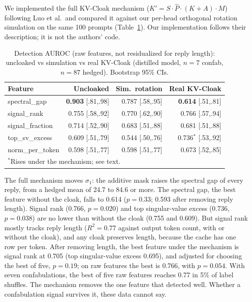 We implemented the full KV-Cloak mechanism
($K' = S \cdot \hat{P} \cdot (K + A) \cdot M$) following
Luo et al.\ and compared it against our per-head orthogonal rotation
simulation on the same 100 prompts (Table~\ref{tab:real_vs_sim}). Our
implementation follows their description; it is not the authors' code.

\begin{table}[h]
\centering
\caption{Detection AUROC (raw features, not residualized for reply
length): uncloaked vs simulation vs real KV-Cloak (distilled model, $n=7$
confab, $n=87$ hedged). Bootstrap 95\% CIs.}
\label{tab:real_vs_sim}
\begin{tabular}{lrrr}
\toprule
Feature & Uncloaked & Sim.\ rotation & Real KV-Cloak \\
\midrule
spectral\_gap & \textbf{0.903} [.81,.98] & 0.787 [.58,.95] & \textbf{0.614} [.51,.81] \\
signal\_rank & 0.755 [.58,.92] & 0.770 [.62,.90] & 0.766 [.57,.94] \\
signal\_fraction & 0.714 [.52,.90] & 0.683 [.51,.88] & 0.681 [.51,.88] \\
top\_sv\_excess & 0.609 [.51,.79] & 0.544 [.50,.76] & 0.736$^*$ [.53,.92] \\
norm\_per\_token & 0.598 [.51,.77] & 0.598 [.51,.77] & 0.673 [.52,.85] \\
\bottomrule
\multicolumn{4}{l}{\footnotesize $^*$Rises under the mechanism; see text.}
\end{tabular}
\end{table}

The full mechanism moves $\sigma_1$: the additive mask raises the spectral
gap of every reply, from a hedged mean of 24.7 to 84.6 or more. The
spectral gap, the best feature without the cloak, falls to 0.614
($p = 0.33$; 0.593 after removing reply length). Signal rank (0.766,
$p = 0.020$) and top singular-value excess (0.736, $p = 0.038$) are no
lower than without the cloak (0.755 and 0.609). But signal rank mostly
tracks reply length ($R^2 = 0.77$ against output token count, with or
without the cloak), and any cloak preserves length, because the cache has
one row per token. After removing length, the best feature under the
mechanism is signal rank at 0.705 (top singular-value excess 0.695), and
adjusted for choosing the best of five, $p = 0.19$; on raw features the
best is 0.766, with $p = 0.054$. With seven confabulations, the best of
five raw features reaches 0.77 in 5\% of label shuffles. The mechanism
removes the one feature that detected well. Whether a confabulation
signal survives it, these data cannot say.

